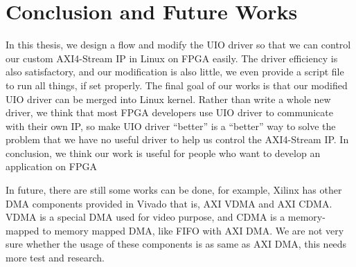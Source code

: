 \chapter{Conclusion and Future Works}
\label{cha:conclusion and Future Works}

In this thesis, we design a flow and modify the UIO driver so that we can control our custom AXI4-Stream IP in Linux on FPGA easily. The driver efficiency is also satisfactory, and our modification is also little, we even provide a script file to run all things, if set properly. The final goal of our works is that our modified UIO driver can be merged into Linux kernel. Rather than write a whole new driver, we think that most FPGA developers use UIO driver to communicate with their own IP, so make UIO driver ``better'' is a ``better'' way to solve the problem that we have no useful driver to help us control the AXI4-Stream IP. In conclusion, we think our work is useful for people who want to develop an application on FPGA

In future, there are still some works can be done, for example, Xilinx has other DMA components provided in Vivado that is, AXI VDMA and AXI CDMA. VDMA is a special DMA used for video purpose, and CDMA is a memory-mapped to memory mapped DMA, like FIFO with AXI DMA. We are not very sure whether the usage of these components is as same as AXI DMA, this needs more test and research. 





